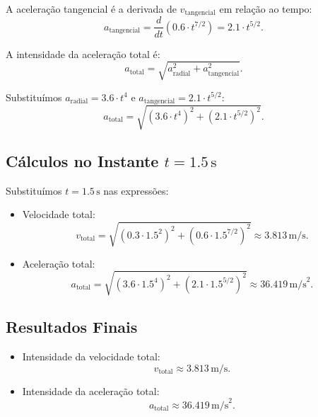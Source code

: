 A aceleração tangencial é a derivada de \(v_{\text{tangencial}}\) em relação ao tempo:
\[
a_{\text{tangencial}} = \frac{d}{dt}\left(0.6 \cdot t^{7/2}\right) = 2.1 \cdot t^{5/2}.
\]

A intensidade da aceleração total é:
\[
a_{\text{total}} = \sqrt{a_{\text{radial}}^2 + a_{\text{tangencial}}^2}.
\]

Substituímos \(a_{\text{radial}} = 3.6 \cdot t^4\) e \(a_{\text{tangencial}} = 2.1 \cdot t^{5/2}\):
\[
a_{\text{total}} = \sqrt{\left(3.6 \cdot t^4\right)^2 + \left(2.1 \cdot t^{5/2}\right)^2}.
\]

\subsection*{Cálculos no Instante \(t = 1.5 \, \text{s}\)}
Substituímos \(t = 1.5 \, \text{s}\) nas expressões:
\begin{itemize}
    \item Velocidade total:
    \[
    v_{\text{total}} = \sqrt{\left(0.3 \cdot 1.5^2\right)^2 + \left(0.6 \cdot 1.5^{7/2}\right)^2} \approx 3.813 \, \text{m/s}.
    \]
    \item Aceleração total:
    \[
    a_{\text{total}} = \sqrt{\left(3.6 \cdot 1.5^4\right)^2 + \left(2.1 \cdot 1.5^{5/2}\right)^2} \approx 36.419 \, \text{m/s}^2.
    \]
\end{itemize}

\subsection*{Resultados Finais}
\begin{itemize}
    \item Intensidade da velocidade total:
    \[
    v_{\text{total}} \approx 3.813 \, \text{m/s}.
    \]
    \item Intensidade da aceleração total:
    \[
    a_{\text{total}} \approx 36.419 \, \text{m/s}^2.
    \]
\end{itemize}
